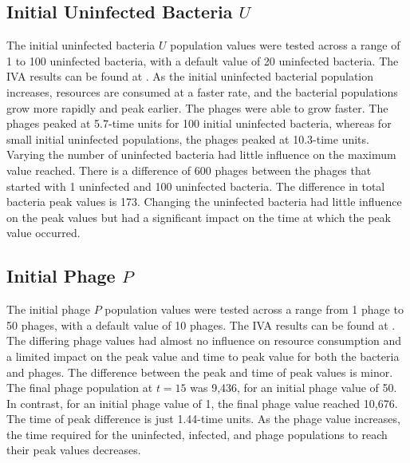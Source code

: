 \subsection{Initial Uninfected Bacteria $U$}
The initial uninfected bacteria $U$ population values were tested across a range of 1 to 100 uninfected bacteria, with a default value of 20 uninfected bacteria. 
The IVA results can be found at . 
As the initial uninfected bacterial population increases, resources are consumed at a faster rate, and the bacterial populations grow more rapidly and peak earlier. The phages were able to grow faster. 
The phages peaked at 5.7-time units for 100 initial uninfected bacteria, whereas for small initial uninfected populations, the phages peaked at 10.3-time units. 
Varying the number of uninfected bacteria had little influence on the maximum value reached. There is a difference of 600 phages between the phages that started with 1 uninfected and 100 uninfected bacteria. 
The difference in total bacteria peak values is 173. 
Changing the uninfected bacteria had little influence on the peak values but had a significant impact on the time at which the peak value occurred. 

\subsection{Initial Phage $P$}
The initial phage $P$ population values were tested across a range from 1 phage to 50 phages, with a default value of 10 phages. 
The IVA results can be found at . 
The differing phage values had almost no influence on resource consumption and a limited impact on the peak value and time to peak value for both the bacteria and phages. 
The difference between the peak and time of peak values is minor. 
The final phage population at $t=15$ was 9,436, for an initial phage value of 50. In contrast, for an initial phage value of 1, the final phage value reached 10,676. 
The time of peak difference is just 1.44-time units. 
As the phage value increases, the time required for the uninfected, infected, and phage populations to reach their peak values decreases. 

